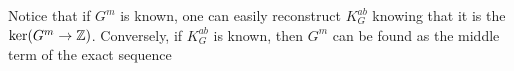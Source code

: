 %

Notice that if $G^m$ is known, one can easily reconstruct $K_G^{ab}$ knowing that it is the $\ker(G^m\to \operatorname{\mathbb{Z}})$. Conversely, if $K_G^{ab}$ is known, then $G^m$ can be found as the middle term of the exact sequence 




